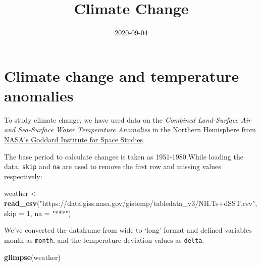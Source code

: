 \documentclass[
]{article}
\title{Climate Change}
\author{}
\date{\vspace{-2.5em}2020-09-04}
\newenvironment{Shaded}{\begin{snugshade}}{\end{snugshade}}
\newcommand{\DataTypeTok}[1]{\textcolor[rgb]{0.13,0.29,0.53}{#1}}
\newcommand{\DecValTok}[1]{\textcolor[rgb]{0.00,0.00,0.81}{#1}}
\newcommand{\KeywordTok}[1]{\textcolor[rgb]{0.13,0.29,0.53}{\textbf{#1}}}
\newcommand{\NormalTok}[1]{#1}
\newcommand{\StringTok}[1]{\textcolor[rgb]{0.31,0.60,0.02}{#1}}
\begin{document}
\maketitle

{
\setcounter{tocdepth}{2}
\tableofcontents
}
\hypertarget{climate-change-and-temperature-anomalies}{%
\section{Climate change and temperature
anomalies}\label{climate-change-and-temperature-anomalies}}

To study climate change, we have used data on the \emph{Combined
Land-Surface Air and Sea-Surface Water Temperature Anomalies} in the
Northern Hemisphere from
\href{https://data.giss.nasa.gov/gistemp}{NASA's Goddard Institute for
Space Studies}.

The base period to calculate changes is taken as 1951-1980.While loading
the data, \texttt{skip} and \texttt{na} are used to remove the first row
and missing values respectively:

\begin{Shaded}
\begin{Highlighting}[]
\NormalTok{weather <-}\StringTok{ }
\StringTok{  }\KeywordTok{read_csv}\NormalTok{(}\StringTok{"https://data.giss.nasa.gov/gistemp/tabledata_v3/NH.Ts+dSST.csv"}\NormalTok{, }
           \DataTypeTok{skip =} \DecValTok{1}\NormalTok{, }
           \DataTypeTok{na =} \StringTok{"***"}\NormalTok{)}
\end{Highlighting}
\end{Shaded}

We've converted the dataframe from wide to `long' format and defined
variables month as \texttt{month}, and the temperature deviation values
as \texttt{delta}.

\begin{Shaded}
\begin{Highlighting}[]
\KeywordTok{glimpse}\NormalTok{(weather)}
\end{Highlighting}
\end{Shaded}
\end{document}
